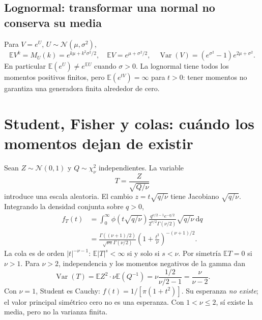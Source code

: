 \documentclass[11pt,a4paper]{article}
\newcommand{\E}{\mathbb E}
\newcommand{\dd}{\,\mathrm d}
\DeclareMathOperator{\Var}{Var}
\theoremstyle{definition}
\begin{document}
\subsection{Lognormal: transformar una normal no conserva su media}
Para $V=e^U$, $U\sim\mathcal N(\mu,\sigma^2)$,
\[
\E V^k=M_U(k)=e^{k\mu+k^2\sigma^2/2},\quad
\E V=e^{\mu+\sigma^2/2},\quad
\Var(V)=(e^{\sigma^2}-1)e^{2\mu+\sigma^2}.
\]
En particular $\E(e^U)\ne e^{\E U}$ cuando $\sigma>0$. La lognormal tiene todos los momentos positivos finitos, pero $\E(e^{tV})=\infty$ para $t>0$: tener momentos no garantiza una generadora finita alrededor de cero.

\section{Student, Fisher y colas: cuándo los momentos dejan de existir}
Sean $Z\sim\mathcal N(0,1)$ y $Q\sim\chi^2_\nu$ independientes. La variable
\[
T=\frac{Z}{\sqrt{Q/\nu}}
\]
introduce una escala aleatoria. El cambio $z=t\sqrt{q/\nu}$ tiene Jacobiano $\sqrt{q/\nu}$. Integrando la densidad conjunta sobre $q>0$,
\begin{align*}
f_T(t)&=\int_0^\infty \phi(t\sqrt{q/\nu})
\frac{q^{\nu/2-1}e^{-q/2}}{2^{\nu/2}\Gamma(\nu/2)}\sqrt{q/\nu}\dd q\\
&=\frac{\Gamma((\nu+1)/2)}{\sqrt{\nu\pi}\Gamma(\nu/2)}
\left(1+\frac{t^2}{\nu}\right)^{-(\nu+1)/2}.
\end{align*}
La cola es de orden $|t|^{-\nu-1}$: $\E|T|^s<\infty$ si y solo si $s<\nu$. Por simetría $\E T=0$ si $\nu>1$. Para $\nu>2$, independencia y los momentos negativos de la gamma dan
\[
\Var(T)=\E Z^2\cdot\nu\E(Q^{-1})
=\nu\frac{1/2}{\nu/2-1}=\frac\nu{\nu-2}.
\]
Con $\nu=1$, Student es Cauchy: $f(t)=1/[\pi(1+t^2)]$. Su esperanza \emph{no existe}; el valor principal simétrico cero no es una esperanza. Con $1<\nu\le2$, sí existe la media, pero no la varianza finita.
\end{document}
